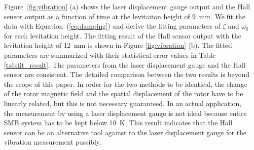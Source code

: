 \documentclass[a4paper,11pt]{jpconf}
\begin{document}
Figure~\ref{fig:vibration} (a) shows the laser displacement gauge output and the Hall sensor output as a function of time at the levitation height of 9~mm.
We fit the data with Equation~(\ref{eq:damping}) and derive the fitting parameters of $\zeta$ and $\omega_{0}$ for each levitation height.
The fitting result of the Hall sensor output with the levitation height of 12~mm is shown in Figure \ref{fig:vibration} (b).
The fitted parameters are summarized with their statistical error values in Table \ref{tab:fit_result}.
The parameters from the laser displacement gauge and the Hall sensor are consistent.
The detailed comparison between the two results is beyond the scope of this paper. 
In order for the two methods to be identical, the change of the rotor magnetic field and the spatial displacement of the rotor have to be linearly related, but this is not necessary guaranteed. 
In an actual application, the measurement by using a laser displacement gauge is not ideal because entire SMB system has to be kept below 10~K. 
This result indicates that the Hall sensor can be an alternative tool against to the laser displacement gauge for the vibration measurement passibly.
\end{document}
